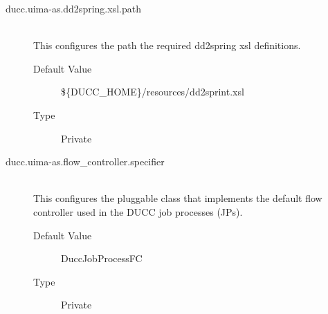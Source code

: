 \begin{description}
      \item[ducc.uima-as.dd2spring.xsl.path] \hfill \\
        This configures the path the required dd2spring xsl definitions. 
        \begin{description}
          \item[Default Value] \$\{DUCC\_HOME\}/resources/dd2sprint.xsl
          \item[Type] Private 
        \end{description}
        
      \item[ducc.uima-as.flow\_controller.specifier] \hfill \\
        This configures the pluggable class that implements the default flow controller used in the 
        DUCC job processes (JPs). 
        \begin{description}
          \item[Default Value] DuccJobProcessFC 
          \item[Type] Private 
        \end{description}
      \end{description}
      
